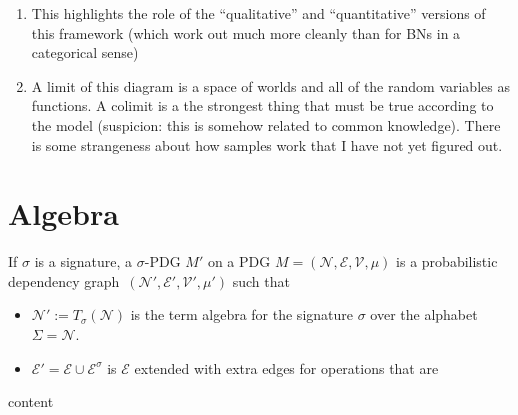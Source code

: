 \documentclass{article}
\theoremstyle{plain}
\theoremstyle{definition}
\theoremstyle{remark}
\newcommand{\Ed}{\mathcal E}
\newcommand{\modelname}{probabilistic dependency graph}
\numberwithin{equation}{section}
\begin{document}
{\begin{vcat}
\begin{enumerate}
		\item This highlights the role of the ``qualitative'' and ``quantitative'' versions of this framework (which work out much more cleanly than for BNs in a categorical sense)
		
		\item A limit of this diagram is a space of worlds and all of the random variables as functions. A colimit is a the strongest thing that must be true according to the model (suspicion: this is somehow related to common knowledge). There is some strangeness about how samples work that I have not yet figured out.
	\end{enumerate}
	
	
	\section{Algebra}\label{sec:algebra}
	\begin{defn}
		If $\sigma$ is a signature, a $\sigma$-PDG $M'$ on a PDG $M=(\mathcal N, \Ed, \mathcal V, \mu)$ is a \modelname\ $(\mathcal N', \Ed', \mathcal V', \mu')$ such that
		\begin{itemize}
			\item $\mathcal N':= T_\sigma(\mathcal N)$ is the term algebra for the signature $\sigma$ over the alphabet $\Sigma = \mathcal N$.
			\item $\Ed' = \Ed \cup \Ed^\sigma$ is $\Ed$ extended with extra edges for operations that are 
		\end{itemize}
	\end{defn}
	
	\begin{example}
		content
	\end{example}		
\end{vcat}

}
\end{document}
